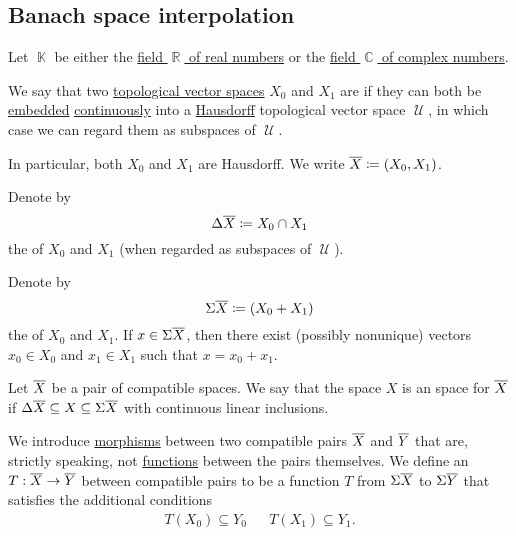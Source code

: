 \subsection{Banach space interpolation}\label{subsec:banach_space_interpolation}

\begin{definition}\label{def:interpolated_topological_vector_space}
  Let \( \BbbK \) be either the \hyperref[def:real_numbers]{field \( \BbbR \) of real numbers} or the \hyperref[def:real_numbers]{field \( \BbbC \) of complex numbers}.

  \begin{thmenum}
     We say that two \hyperref[def:topological_vector_space]{topological vector spaces} \( X_0 \) and \( X_1 \) are  if they can both be \hyperref[def:morphism_invertibility/left_cancellative]{embedded} \hyperref[def:global_continuity]{continuously} into a \hyperref[def:separation_axioms/T2]{Hausdorff} topological vector space \( \mscrU \), in which case we can regard them as subspaces of \( \mscrU \).

    In particular, both \( X_0 \) and \( X_1 \) are Hausdorff. We write \( \oline{X} \coloneqq (X_0, X_1) \).

     Denote by
    \begin{equation*}
      \Delta \oline{X} \coloneqq X_0 \cap X_1
    \end{equation*}
    the  of \( X_0 \) and \( X_1 \) (when regarded as subspaces of \( \mscrU \)).

     Denote by
    \begin{equation*}
      \Sigma \oline{X} \coloneqq ( X_0 + X_1 )
    \end{equation*}
    the  of \( X_0 \) and \( X_1 \). If \( x \in \Sigma \oline{X} \), then there exist (possibly nonunique) vectors \( x_0 \in X_0 \) and \( x_1 \in X_1 \) such that \( x = x_0 + x_1 \).

     Let \( \oline{X} \) be a pair of compatible spaces. We say that the space \( X \) is an  space for \( \oline{X} \) if \( \Delta \oline{X} \subseteq X \subseteq \Sigma \oline{X} \) with continuous linear inclusions.

     We introduce \hyperref[def:category/morphisms]{morphisms} between two compatible pairs \( \oline{X} \) and \( \oline{Y} \) that are, strictly speaking, not \hyperref[def:function]{functions} between the pairs themselves. We define an  \( T: \oline{X} \to \oline{Y} \) between compatible pairs to be a function \( T \) from \( \Sigma \oline{X} \) to \( \Sigma \oline{Y} \) that satisfies the additional conditions
    \begin{align*}
      T(X_0) \subseteq Y_0
      &&
      T(X_1) \subseteq Y_1.
    \end{align*}


\end{thmenum}
\end{definition}
